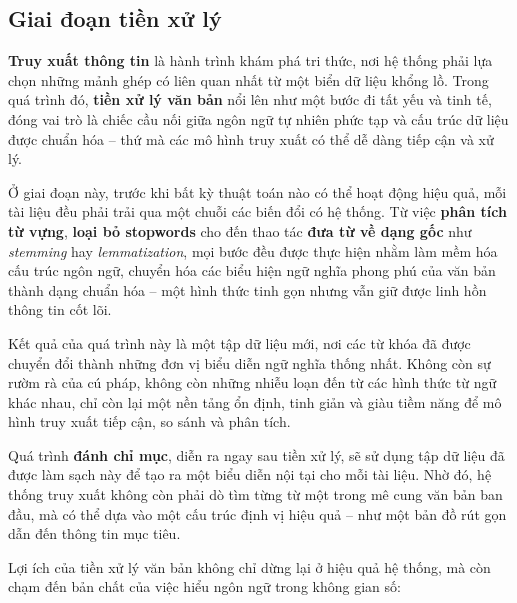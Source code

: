 \subsection{Giai đoạn tiền xử lý}
\textbf{Truy xuất thông tin} là hành trình khám phá tri thức, nơi hệ thống phải lựa chọn những mảnh ghép có liên quan nhất từ một biển dữ liệu khổng lồ. Trong quá trình đó, \textbf{tiền xử lý văn bản} nổi lên như một bước đi tất yếu và tinh tế, đóng vai trò là chiếc cầu nối giữa ngôn ngữ tự nhiên phức tạp và cấu trúc dữ liệu được chuẩn hóa -- thứ mà các mô hình truy xuất có thể dễ dàng tiếp cận và xử lý.

Ở giai đoạn này, trước khi bất kỳ thuật toán nào có thể hoạt động hiệu quả, mỗi tài liệu đều phải trải qua một chuỗi các biến đổi có hệ thống. Từ việc \textbf{phân tích từ vựng}, \textbf{loại bỏ stopwords} cho đến thao tác \textbf{đưa từ về dạng gốc} như \textit{stemming} hay \textit{lemmatization}, mọi bước đều được thực hiện nhằm làm mềm hóa cấu trúc ngôn ngữ, chuyển hóa các biểu hiện ngữ nghĩa phong phú của văn bản thành dạng chuẩn hóa -- một hình thức tinh gọn nhưng vẫn giữ được linh hồn thông tin cốt lõi.

Kết quả của quá trình này là một tập dữ liệu mới, nơi các từ khóa đã được chuyển đổi thành những đơn vị biểu diễn ngữ nghĩa thống nhất. Không còn sự rườm rà của cú pháp, không còn những nhiễu loạn đến từ các hình thức từ ngữ khác nhau, chỉ còn lại một nền tảng ổn định, tinh giản và giàu tiềm năng để mô hình truy xuất tiếp cận, so sánh và phân tích.

Quá trình \textbf{đánh chỉ mục}, diễn ra ngay sau tiền xử lý, sẽ sử dụng tập dữ liệu đã được làm sạch này để tạo ra một biểu diễn nội tại cho mỗi tài liệu. Nhờ đó, hệ thống truy xuất không còn phải dò tìm từng từ một trong mê cung văn bản ban đầu, mà có thể dựa vào một cấu trúc định vị hiệu quả -- như một bản đồ rút gọn dẫn đến thông tin mục tiêu.

Lợi ích của tiền xử lý văn bản không chỉ dừng lại ở hiệu quả hệ thống, mà còn chạm đến bản chất của việc hiểu ngôn ngữ trong không gian số:

